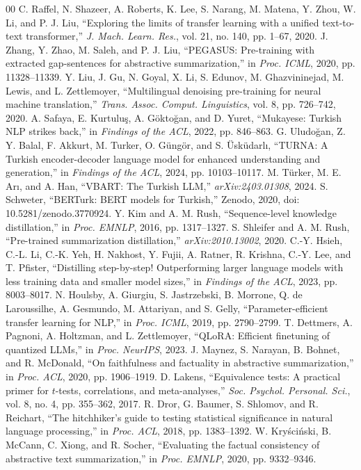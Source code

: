 \documentclass[conference]{IEEEtran}
\begin{document}
\begin{thebibliography}{00}
 C. Raffel, N. Shazeer, A. Roberts, K. Lee, S. Narang, M. Matena, Y. Zhou, W. Li, and P. J. Liu, ``Exploring the limits of transfer learning with a unified text-to-text transformer,'' \emph{J. Mach. Learn. Res.}, vol. 21, no. 140, pp. 1--67, 2020.
 J. Zhang, Y. Zhao, M. Saleh, and P. J. Liu, ``PEGASUS: Pre-training with extracted gap-sentences for abstractive summarization,'' in \emph{Proc. ICML}, 2020, pp. 11328--11339.
 Y. Liu, J. Gu, N. Goyal, X. Li, S. Edunov, M. Ghazvininejad, M. Lewis, and L. Zettlemoyer, ``Multilingual denoising pre-training for neural machine translation,'' \emph{Trans. Assoc. Comput. Linguistics}, vol. 8, pp. 726--742, 2020.
 A. Safaya, E. Kurtulu\c{s}, A. G\"okto\u{g}an, and D. Yuret, ``Mukayese: {T}urkish {NLP} strikes back,'' in \emph{Findings of the ACL}, 2022, pp. 846--863.
 G. Uludo\u{g}an, Z. Y. Balal, F. Akkurt, M. Turker, O. G\"ung\"or, and S. \"Usk\"udarl\i, ``{TURNA}: A {T}urkish encoder-decoder language model for enhanced understanding and generation,'' in \emph{Findings of the ACL}, 2024, pp. 10103--10117.
 M. T\"urker, M. E. Ar\i, and A. Han, ``{VBART}: The {T}urkish {LLM},'' \emph{arXiv:2403.01308}, 2024.
 S. Schweter, ``{BERTurk}: {BERT} models for {T}urkish,'' Zenodo, 2020, doi: 10.5281/zenodo.3770924.
 Y. Kim and A. M. Rush, ``Sequence-level knowledge distillation,'' in \emph{Proc. EMNLP}, 2016, pp. 1317--1327.
 S. Shleifer and A. M. Rush, ``Pre-trained summarization distillation,'' \emph{arXiv:2010.13002}, 2020.
 C.-Y. Hsieh, C.-L. Li, C.-K. Yeh, H. Nakhost, Y. Fujii, A. Ratner, R. Krishna, C.-Y. Lee, and T. Pfister, ``Distilling step-by-step! Outperforming larger language models with less training data and smaller model sizes,'' in \emph{Findings of the ACL}, 2023, pp. 8003--8017.
 N. Houlsby, A. Giurgiu, S. Jastrzebski, B. Morrone, Q. de Laroussilhe, A. Gesmundo, M. Attariyan, and S. Gelly, ``Parameter-efficient transfer learning for NLP,'' in \emph{Proc. ICML}, 2019, pp. 2790--2799.
 T. Dettmers, A. Pagnoni, A. Holtzman, and L. Zettlemoyer, ``{QLoRA}: Efficient finetuning of quantized {LLMs},'' in \emph{Proc. NeurIPS}, 2023.
 J. Maynez, S. Narayan, B. Bohnet, and R. McDonald, ``On faithfulness and factuality in abstractive summarization,'' in \emph{Proc. ACL}, 2020, pp. 1906--1919.
 D. Lakens, ``Equivalence tests: A practical primer for $t$-tests, correlations, and meta-analyses,'' \emph{Soc. Psychol. Personal. Sci.}, vol. 8, no. 4, pp. 355--362, 2017.
 R. Dror, G. Baumer, S. Shlomov, and R. Reichart, ``The hitchhiker's guide to testing statistical significance in natural language processing,'' in \emph{Proc. ACL}, 2018, pp. 1383--1392.
 W. Kry\'sci\'nski, B. McCann, C. Xiong, and R. Socher, ``Evaluating the factual consistency of abstractive text summarization,'' in \emph{Proc. EMNLP}, 2020, pp. 9332--9346.
\end{thebibliography}
\end{document}
